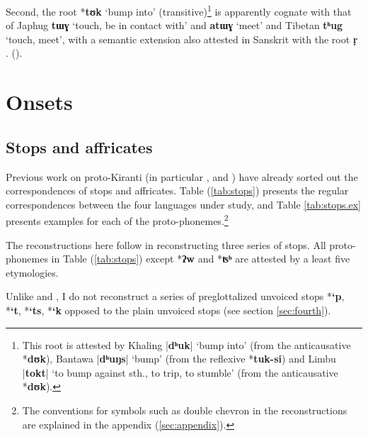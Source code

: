 \documentclass[oneside,a4paper,11pt]{article}
\newcommand{\ipa}[1]{\textbf{{\phon\mbox{#1}}}} %
\newcommand{\dhatu}[2]{|\ipa{#1}| `#2'}
\begin{document}
Second,  the root *\ipa{tʊk} `bump into' (transitive)\footnote{This root is attested by Khaling \dhatu{dʰuk}{bump into} (from the anticausative  *\ipa{dʊk}), Bantawa  \dhatu{dʰuŋs}{bump} (from the reflexive *\ipa{tuk-si}) and Limbu \dhatu{tokt}{to bump against sth., to trip, to stumble}  (from the anticausative  *\ipa{dʊk}).} is apparently cognate with that of Japhug \ipa{tɯɣ} `touch, be in contact with' and \ipa{atɯɣ} `meet' and Tibetan \ipa{tʰug} `touch, meet', with a semantic extension also attested in Sanskrit with the root \ipa{ṛ} .
(\citealt[3]{pooth15eri}).

\section{Onsets} \label{sec:onsets}

\subsection{Stops and affricates} \label{sec:stops}

Previous work on proto-Kiranti (in particular \citealt{starostin94kiranti}, \citealt{michailovsky94stops} and \citealt{opgenort05jero}) have already sorted out the correspondences of stops and affricates. Table (\ref{tab:stops}) presents the regular correspondences between the four languages under study, and Table \ref{tab:stops.ex} presents examples for each of the proto-phonemes.\footnote{The conventions for symbols such as double chevron in the reconstructions are explained in the appendix (\ref{sec:appendix}).}


The reconstructions here follow \citet{michailovsky94stops} in reconstructing three series of stops.  All proto-phonemes in Table (\ref{tab:stops}) except *\ipa{ʔw} and *\ipa{ʦʰ} are attested by a least five etymologies.

Unlike \citet{starostin94kiranti} and \citet{opgenort05jero}, I do not reconstruct a series of preglottalized unvoiced stops *\ipa{`p},  *\ipa{`t},  *\ipa{`ts},  *\ipa{`k} opposed to the plain unvoiced stops (see section \ref{sec:fourth}). 
\end{document}
